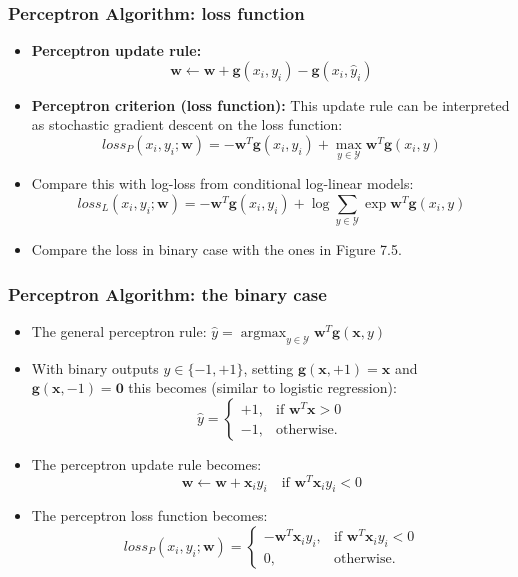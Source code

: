 \documentclass[ignorenonframetext,plain]{beamer}
\DeclareMathOperator*{\argmax}{argmax}
\newcommand{\loss}{\mathit{loss}}
\renewcommand{\vec}{\mathbf}
\begin{document}
\begin{frame}\frametitle{Perceptron Algorithm: loss function}
\begin{itemize}
\item {\bf Perceptron update rule:}
\[ \vec{w} \leftarrow \vec{w} 
+\vec{g}(x_i,y_i)
-\vec{g}(x_i,\hat{y}_i) 
\]
\item {\bf Perceptron criterion (loss function):} This update rule can
  be interpreted as stochastic gradient descent on the loss function:
\[
\loss_P(x_i, y_i; \vec{w}) = 
-\vec{w}^T \vec{g}(x_i,y_i)
+\max_{y\in\mathcal{Y}} \vec{w}^T \vec{g}(x_i,y)
\]

\item Compare this with log-loss from conditional log-linear models: \[
\loss_L(x_i, y_i; \vec{w}) = 
-\vec{w}^T \vec{g}(x_i,y_i) 
+\log \sum_{y\in\mathcal{Y}} \exp \vec{w}^T \vec{g}(x_i,y) 
\]

\item Compare the loss in binary case with the ones in Figure 7.5.
\end{itemize}
\end{frame}

\begin{frame}\frametitle{Perceptron Algorithm: the binary case}
\begin{itemize}
\item The general perceptron rule: $
\hat{y} = \argmax_{y\in\mathcal{Y}} \vec{w}^T \vec{g}(\vec{x}, y)
$
\item With binary outputs $y\in\{-1,+1\}$, setting $\vec{g}(\vec{x},
  +1) = \vec{x}$ and $\vec{g}(\vec{x}, -1) = \vec{0}$ this becomes
  (similar to logistic regression): \[ 
\hat{y} = \begin{cases}
+1,& \text{if } \vec{w}^T \vec{x} > 0\\
-1,& \text{otherwise.}
\end{cases}
\]
\item The perceptron update rule becomes: \[
\vec{w} \leftarrow \vec{w} 
+ \vec{x}_i y_i
\quad\text{if } \vec{w}^T\vec{x}_i y_i < 0
\]
\item The perceptron loss function becomes: \[
\loss_P(x_i, y_i; \vec{w}) = \begin{cases}
-\vec{w}^T\vec{x}_i y_i,& \text{if } \vec{w}^T\vec{x}_i y_i<0 \\
0,& \text{otherwise.}
\end{cases}
\]
\end{itemize}
\end{frame}
\end{document}
